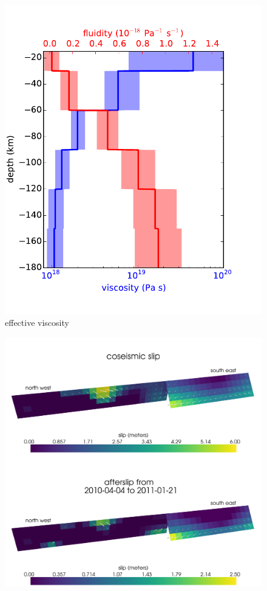 \documentclass[12pt]{article}
\begin{document}
\begin{figure}
\includegraphics[scale=1.0]{Figures/effective_viscosity}
\centering 
\caption{effective viscosity}
\label{fig:EffectiveViscosity}
\end{figure} 

\begin{figure}
\includegraphics[scale=0.09]{Figures/initialslip}
\caption{}
\label{fig:InitialSlip}
\end{figure} 
\end{document}
